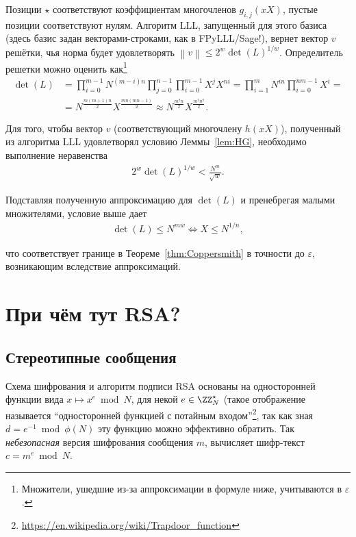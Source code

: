 \documentclass[11pt]{exam}
\theoremstyle{definition}
\newcommand*\norm[1]{\left\lVert#1\right\rVert}
\begin{document}
{	Позиции $\star$ соответствуют коэффициентам многочленов $g_{i,j}(xX)$, пустые позиции соответствуют нулям. Алгоритм LLL, запущенный для этого базиса (здесь базис задан векторами-строками, как в FPyLLL/Sage!), вернет вектор $v$ решётки, чья норма будет удовлетворять $\norm{v} \leq 2^{w} \det(L)^{1/w}$. Определитель решетки можно оценить как\footnote{Множители, ушедшие из-за аппроксимации в формуле ниже, учитываются в $\varepsilon$.}
	\begin{align*}
		\det(L) &= \prod_{i=0}^{m-1} N^{(m-i)n} \prod_{j=0}^{n-1} \prod_{i=0}^{m-1} X^j X^{ni} = \prod_{i=1}^{m} N^{in} \prod_{i=0}^{nm-1} X^i = \\
		&= N^{\frac{m(m+1)n}{2}} X^{\frac{mn(mn-1)}{2}} \approx N^{\frac{m^2n}{2}}X^{\frac{m^2n^2}{2}}.
	\end{align*}
	
	Для того, чтобы вектор $v$ (соответствующий многочлену $h(xX)$), полученный из алгоритма LLL удовлетворял условию Леммы~\ref{lem:HG}, необходимо выполнение неравенства
	\begin{align*}
		2^{w} \det(L)^{1/w} < \frac{N^m}{\sqrt{w}}.
	\end{align*}
	 
	 Подставляя полученную аппроксимацию для $\det(L)$ и пренебрегая малыми множителями, условие выше дает
	 \begin{align*}
	 	\det(L) \leq N^{mw} \iff X \leq N^{1/n},
	 \end{align*}
	 
	 что соответствует границе в Теореме~\ref{thm:Coppersmith} в точности до $\varepsilon$, возникающим вследствие аппроксимаций.
	
	\section{При чём тут RSA?}
	
	\subsection{Стереотипные сообщения}
	Схема шифрования и алгоритм подписи RSA основаны на односторонней функции вида $x \mapsto x^e \bmod N$, для некой $e \in \ZZ_N^\star$ (такое отображение называется ``односторонней функцией с потайным входом''\footnote{\url{https://en.wikipedia.org/wiki/Trapdoor\_function}}, так как зная $d = e^{-1} \bmod \phi(N)$ эту функцию можно эффективно обратить. Так \emph{небезопасная} версия шифрования сообщения $m$, вычисляет шифр-текст $c=m^e \bmod N$. 
	
}
\end{document}
